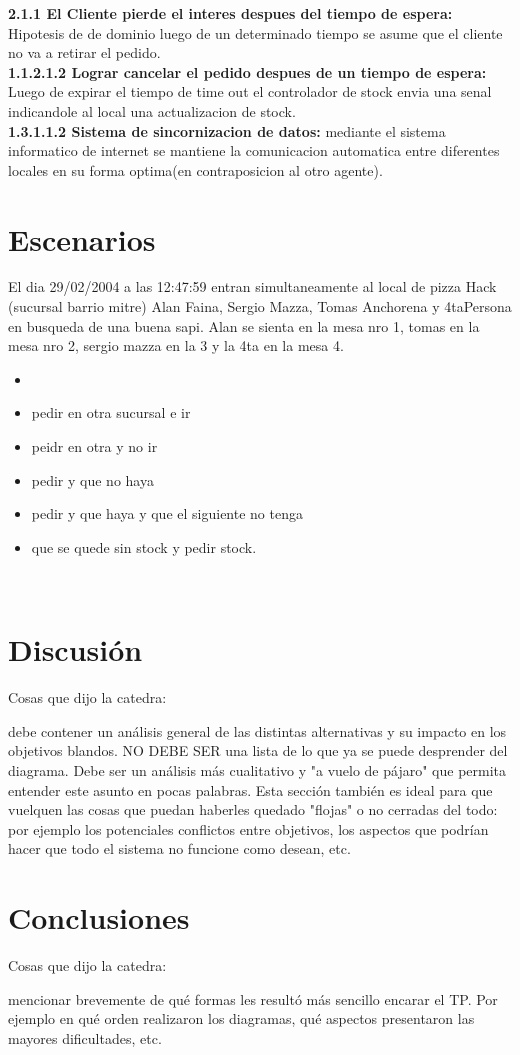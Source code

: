 \documentclass[a4paper,10pt]{article}
\begin{document}
\textbf{2.1.1 El Cliente pierde el interes despues del tiempo de espera:} Hipotesis de de dominio luego de un determinado tiempo se asume que el cliente no va a retirar el pedido.\\
\textbf{1.1.2.1.2 Lograr cancelar el pedido despues de un tiempo de espera:} Luego de expirar el tiempo de time out el controlador de stock envia una senal indicandole al local una actualizacion de stock.\\
\textbf{1.3.1.1.2 Sistema de sincornizacion de datos:}  mediante el sistema informatico de internet se mantiene la comunicacion automatica entre diferentes locales en su forma optima(en contraposicion al otro agente).\\



\section*{Escenarios}

El dia 29/02/2004 a las 12:47:59 entran simultaneamente al local de pizza Hack (sucursal barrio mitre) Alan Faina, Sergio Mazza, Tomas Anchorena y 4taPersona en busqueda de una buena sapi. Alan se sienta en la mesa nro 1, tomas en la mesa nro 2, sergio mazza en la 3 y la 4ta en la mesa 4. 
\begin{itemize}\item
\item pedir en otra sucursal e ir
\item peidr en otra y no ir
\item pedir y que no haya
\item pedir y que haya y que el siguiente no tenga
\item que se quede sin stock y pedir stock.
\end{itemize}

\
\section*{Discusi\'on}

Cosas que dijo la catedra:

debe contener un análisis general de las distintas
alternativas y su impacto en los objetivos blandos. NO DEBE SER una
lista de lo que ya se puede desprender del diagrama. Debe ser un
análisis más cualitativo y "a vuelo de pájaro" que permita entender
este asunto en pocas palabras. Esta sección también es ideal para que
vuelquen las cosas que puedan haberles quedado "flojas" o no cerradas
del todo: por ejemplo los potenciales conflictos entre objetivos, los
aspectos que podrían hacer que todo el sistema no funcione como
desean, etc.


\section*{Conclusiones}

Cosas que dijo la catedra:

mencionar brevemente de qué formas les resultó más
sencillo encarar el TP. Por ejemplo en qué orden realizaron los
diagramas, qué aspectos presentaron las mayores dificultades, etc.
\end{document}

